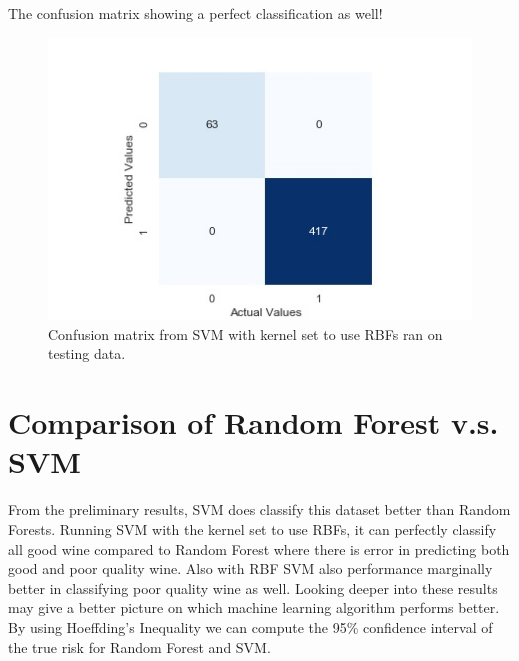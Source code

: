 \documentclass[a4paper,titlepage]{article}
\begin{document}
	\noindent The confusion matrix showing a perfect classification as well!
	\begin{figure}[H]
		\centering
		\includegraphics[scale=0.6]{img/twoclass_svmpoly.jpg}
		\caption{Confusion matrix from SVM with kernel set to use RBFs ran on testing data.}
	\end{figure}
	\section{Comparison of Random Forest v.s. SVM}
	From the preliminary results, SVM does classify this dataset better than Random Forests. Running SVM with the kernel set to use RBFs, it can perfectly classify all good wine compared to Random Forest where there is error in predicting both good and poor quality wine. Also with RBF SVM also performance marginally better in classifying poor quality wine as well. Looking deeper into these results may give a better picture on which machine learning algorithm performs better. By using Hoeffding's Inequality we can compute the 95\% confidence interval of the true risk for Random Forest and SVM.
\end{document}
